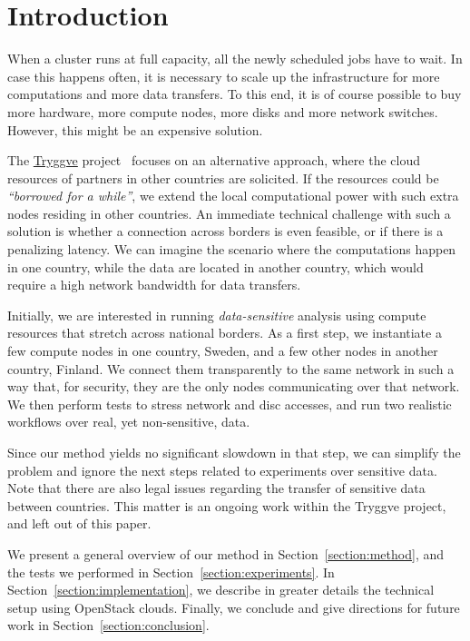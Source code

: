 \section{Introduction}
\label{section:intro}

When a cluster runs at full capacity, all the newly scheduled jobs
have to wait. In case this happens often, it is necessary to scale up
the infrastructure for more computations and more data transfers. To
this end, it is of course possible to buy more hardware, \ie more
compute nodes, more disks and more network switches. However, this
might be an expensive solution.

The \href{https://wiki.neic.no/wiki/Tryggve}{Tryggve}
project~\cite{tryggve} focuses %
on an alternative approach, where the cloud resources of partners in
other countries are solicited.
%
If the resources could be \emph{``borrowed for a while''}, we extend
the local computational power with such extra nodes residing in other
countries.
%
An immediate technical challenge with such a solution is whether a
connection across borders is even feasible, or if there is a
penalizing latency. We can imagine the scenario where the computations
happen in one country, while the data are located in another country,
which would require a high network bandwidth for data transfers.

Initially, we are interested in running \emph{data-sensitive} analysis
using compute resources that stretch across national borders.
%
As a first step, we instantiate a few compute nodes in one country,
Sweden, and a few other nodes in another country, Finland. We connect
them transparently to the same network in such a way that, for
security, they are the only nodes communicating over that network. We
then perform tests to stress network and disc accesses, and run two
realistic workflows over real, yet non-sensitive, data.

Since our method yields no significant slowdown in that step, we
can simplify the problem and ignore the next steps related to
experiments over sensitive data.
%
Note that there are also legal issues regarding the transfer of
sensitive data between countries. This matter is an ongoing work
within the Tryggve project, and left out of this paper.

We present a general overview of our method in
Section~\ref{section:method}, and the tests we performed in
Section~\ref{section:experiments}.
%
In Section~\ref{section:implementation}, we describe in greater
details the technical setup using OpenStack clouds.
%
Finally, we conclude and give directions for future work in
Section~\ref{section:conclusion}.
